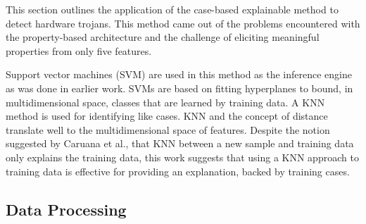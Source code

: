 

This section outlines the application of the case-based explainable method
to detect hardware trojans.  This method came out of the problems encountered
with the property-based architecture and the challenge of eliciting meaningful
properties from only five features.

Support vector machines (SVM) are used in this method as the inference engine as
was done in earlier work.  SVMs are based on fitting hyperplanes to bound, in
multidimensional space, classes that are learned by training data.  A KNN method
is used for identifying like cases. KNN and the concept of distance translate
well to the multidimensional space of features.  Despite the notion suggested by
Caruana et al.\cite{Caruana1999CasebasedEO}, that KNN between a new sample and
training data only explains the training data, this work suggests that using a
KNN approach to training data is effective for providing an explanation, backed
by training cases.

\subsection{Data Processing}

